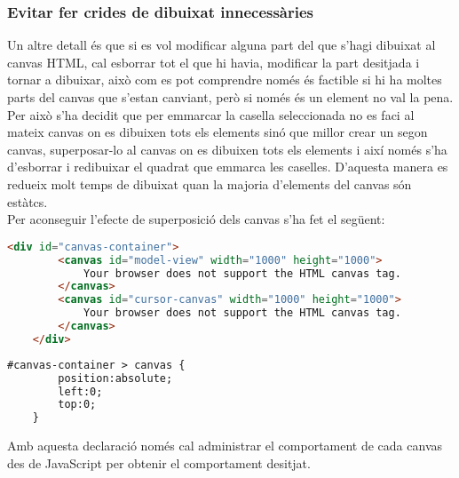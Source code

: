 \subsubsection{Evitar fer crides de dibuixat innecessàries}
Un altre detall és que si es vol modificar alguna part del que s'hagi dibuixat al canvas HTML, cal esborrar tot el que hi havia, modificar la part desitjada i tornar a dibuixar, això com es pot comprendre només és factible si hi ha moltes parts del canvas que s'estan canviant, però si només és un element no val la pena. Per això s'ha decidit que per emmarcar la casella seleccionada no es faci al mateix canvas on es dibuixen tots els elements sinó que millor crear un segon canvas, superposar-lo al canvas on es dibuixen tots els elements i així només s'ha d'esborrar i redibuixar el quadrat que emmarca les caselles. D'aquesta manera es redueix molt temps de dibuixat quan la majoria d'elements del canvas són estàtcs.\\

Per aconseguir l'efecte de superposició dels canvas s'ha fet el següent:

\begin{lstlisting}[language=html, caption=Declaració dels canvas]
    <div id="canvas-container">
        <canvas id="model-view" width="1000" height="1000">
            Your browser does not support the HTML canvas tag.
        </canvas>
        <canvas id="cursor-canvas" width="1000" height="1000">
            Your browser does not support the HTML canvas tag.
        </canvas>
    </div>
\end{lstlisting}

\begin{lstlisting}[language=html, caption=Estil dels canvas]
    #canvas-container > canvas {
        position:absolute;
        left:0;
        top:0;
    }
\end{lstlisting}

Amb aquesta declaració només cal administrar el comportament de cada canvas des de JavaScript per obtenir el comportament desitjat.








